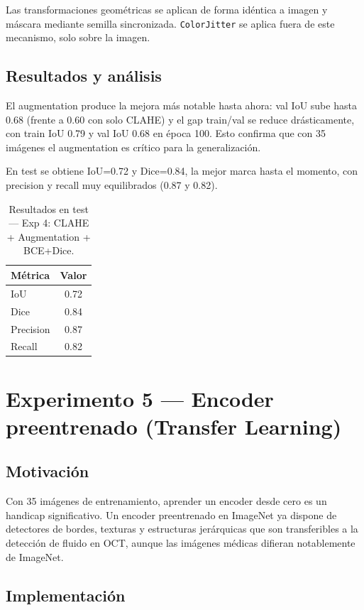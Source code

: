 \documentclass[12pt,a4paper]{article}
\begin{document}
Las transformaciones geométricas se aplican de forma idéntica a imagen y máscara mediante semilla sincronizada. \texttt{ColorJitter} se aplica fuera de este mecanismo, solo sobre la imagen.

\subsection{Resultados y análisis}

El augmentation produce la mejora más notable hasta ahora: val IoU sube hasta 0.68 (frente a 0.60 con solo CLAHE) y el gap train/val se reduce drásticamente, con train IoU 0.79 y val IoU 0.68 en época 100. Esto confirma que con 35 imágenes el augmentation es crítico para la generalización.

En test se obtiene IoU=0.72 y Dice=0.84, la mejor marca hasta el momento, con precision y recall muy equilibrados (0.87 y 0.82).

\begin{table}[H]
\centering
\caption{Resultados en test — Exp 4: CLAHE + Augmentation + BCE+Dice.}
\label{tab:exp4}
\begin{tabular}{lc}
\toprule
Métrica & Valor \\
\midrule
IoU       & 0.72 \\
Dice      & 0.84 \\
Precision & 0.87 \\
Recall    & 0.82 \\
\bottomrule
\end{tabular}
\end{table}

\section{Experimento 5 — Encoder preentrenado (Transfer Learning)}

\subsection{Motivación}

Con 35 imágenes de entrenamiento, aprender un encoder desde cero es un handicap significativo. Un encoder preentrenado en ImageNet ya dispone de detectores de bordes, texturas y estructuras jerárquicas que son transferibles a la detección de fluido en OCT, aunque las imágenes médicas difieran notablemente de ImageNet.

\subsection{Implementación}
\end{document}
